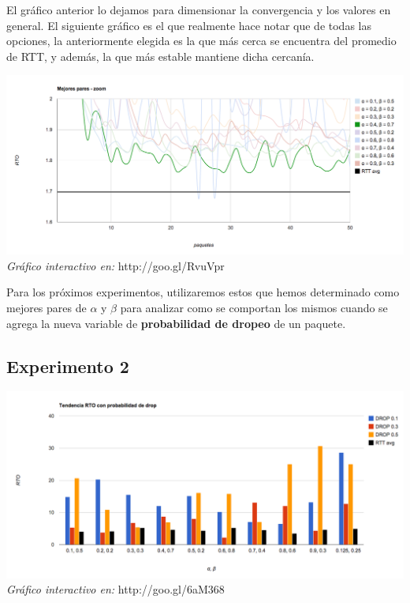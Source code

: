 El gráfico anterior lo dejamos para dimensionar la convergencia y los valores en general. El siguiente gráfico es el que realmente hace notar que de todas las opciones, la anteriormente elegida es la que más cerca se encuentra del promedio de RTT, y además, la que más estable mantiene dicha cercanía.

\begin{center}
	\includegraphics[scale=0.35]{graphics/best_pairs_zoom.png}
	\textit{Gráfico interactivo en:} http://goo.gl/RvuVpr
\end{center}

Para los próximos experimentos, utilizaremos estos que hemos determinado como mejores pares de $\alpha$ y $\beta$ para analizar como se comportan los mismos cuando se agrega la nueva variable de \textbf{probabilidad de dropeo} de un paquete.

\subsection{Experimento 2}

\begin{center}
	\includegraphics[scale=0.35]{graphics/tendencia_RTO_drop.png}
	\textit{Gráfico interactivo en:} http://goo.gl/6aM368
\end{center}
